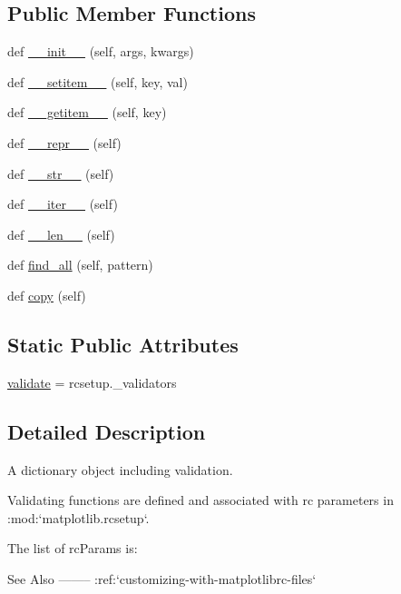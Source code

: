 \subsection*{Public Member Functions}
\begin{DoxyCompactItemize}
\item 
def \hyperlink{classmatplotlib_1_1RcParams_a611dcb93515aa88dfdd197911da46007}{\+\_\+\+\_\+init\+\_\+\+\_\+} (self, args, kwargs)
\item 
def \hyperlink{classmatplotlib_1_1RcParams_a8722f5db52843b6f46c9a67582022531}{\+\_\+\+\_\+setitem\+\_\+\+\_\+} (self, key, val)
\item 
def \hyperlink{classmatplotlib_1_1RcParams_a1ced0dda5389fc1cf5bd01e2badb72c2}{\+\_\+\+\_\+getitem\+\_\+\+\_\+} (self, key)
\item 
def \hyperlink{classmatplotlib_1_1RcParams_a0ae31a89ac265de51717241335d520c0}{\+\_\+\+\_\+repr\+\_\+\+\_\+} (self)
\item 
def \hyperlink{classmatplotlib_1_1RcParams_a19da0bba9dd2ca95e9cb9224548863e3}{\+\_\+\+\_\+str\+\_\+\+\_\+} (self)
\item 
def \hyperlink{classmatplotlib_1_1RcParams_aa805073808773789512686a0cefb979d}{\+\_\+\+\_\+iter\+\_\+\+\_\+} (self)
\item 
def \hyperlink{classmatplotlib_1_1RcParams_aecb98de55546338899bd868359b32493}{\+\_\+\+\_\+len\+\_\+\+\_\+} (self)
\item 
def \hyperlink{classmatplotlib_1_1RcParams_a19a5d9fdc8b0be2d288a8ddad71ff543}{find\+\_\+all} (self, pattern)
\item 
def \hyperlink{classmatplotlib_1_1RcParams_a06de8e80225e514e581ae93371ed2c6c}{copy} (self)
\end{DoxyCompactItemize}
\subsection*{Static Public Attributes}
\begin{DoxyCompactItemize}
\item 
\hyperlink{classmatplotlib_1_1RcParams_aefc67140c0d848c2b03f2d3b8c9a02dd}{validate} = rcsetup.\+\_\+validators
\end{DoxyCompactItemize}


\subsection{Detailed Description}
\begin{DoxyVerb}A dictionary object including validation.

Validating functions are defined and associated with rc parameters in
:mod:`matplotlib.rcsetup`.

The list of rcParams is:


See Also
--------
:ref:`customizing-with-matplotlibrc-files`
\end{DoxyVerb}
 

